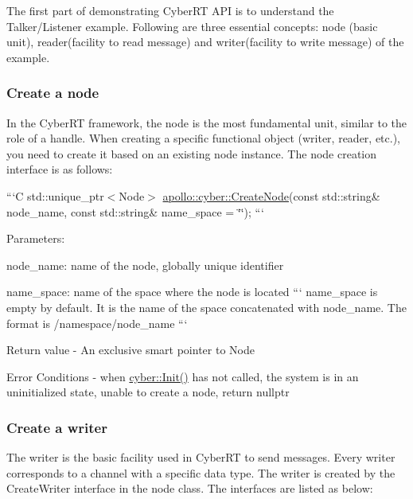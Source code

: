 The first part of demonstrating Cyber\-R\-T A\-P\-I is to understand the Talker/\-Listener example. Following are three essential concepts\-: node (basic unit), reader(facility to read message) and writer(facility to write message) of the example.

\subsubsection*{Create a node}

In the Cyber\-R\-T framework, the node is the most fundamental unit, similar to the role of a {\ttfamily handle}. When creating a specific functional object (writer, reader, etc.), you need to create it based on an existing node instance. The node creation interface is as follows\-:

```\-C std\-::unique\-\_\-ptr$<$\-Node$>$ \hyperlink{namespaceapollo_1_1cyber_ae369c5de0279f2a5745d0438d532bc89}{apollo\-::cyber\-::\-Create\-Node}(const std\-::string\& node\-\_\-name, const std\-::string\& name\-\_\-space = \char`\"{}\char`\"{}); ```


\begin{DoxyItemize}
\item Parameters\-:
\begin{DoxyItemize}
\item node\-\_\-name\-: name of the node, globally unique identifier
\item name\-\_\-space\-: name of the space where the node is located ``` name\-\_\-space is empty by default. It is the name of the space concatenated with node\-\_\-name. The format is /namespace/node\-\_\-name ```
\end{DoxyItemize}
\item Return value -\/ An exclusive smart pointer to Node
\item Error Conditions -\/ when {\ttfamily \hyperlink{namespaceapollo_1_1cyber_a2d055a81b338116634deaf8ac3367aca}{cyber\-::\-Init()}} has not called, the system is in an uninitialized state, unable to create a node, return nullptr
\end{DoxyItemize}

\subsubsection*{Create a writer}

The writer is the basic facility used in Cyber\-R\-T to send messages. Every writer corresponds to a channel with a specific data type. The writer is created by the {\ttfamily Create\-Writer} interface in the node class. The interfaces are listed as below\-:

